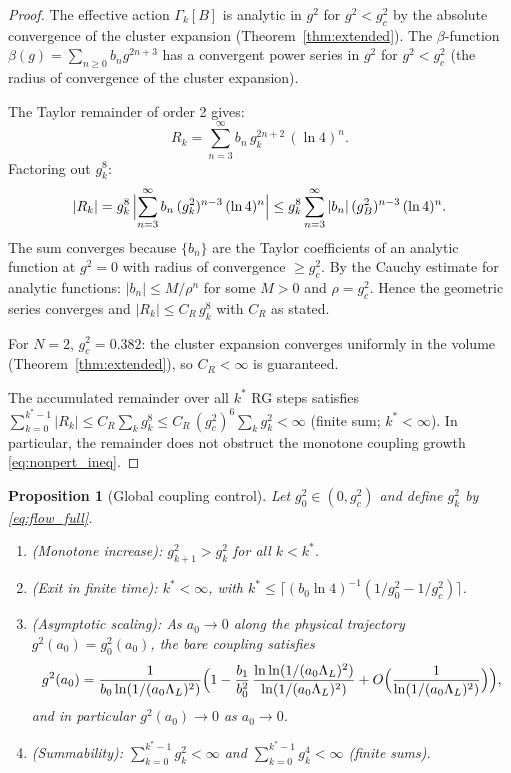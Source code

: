 \documentclass[11pt,a4paper]{amsart}
\newtheorem{proposition}[theorem]{Proposition}
\theoremstyle{definition}
\newcommand{\gB}{g^2_c}
\begin{document}
\begin{proof}
The effective action $\Gamma_k[B]$ is analytic in $g^2$ for $g^2 < \gB$
by the absolute convergence of the cluster expansion (Theorem~\ref{thm:extended}).
The $\beta$-function $\beta(g) = \sum_{n\ge 0} b_n g^{2n+3}$ has a
convergent power series in $g^2$ for $g^2 < \gB$ (the radius of convergence
of the cluster expansion).

The Taylor remainder of order 2 gives:
\[
  R_k = \sum_{n=3}^{\infty} b_n\,g^{2n+2}_k\,(\ln 4)^n.
\]
Factoring out $g^8_k$:
\[
  |R_k| = g^8_k\,\Bigl|\sum_{n=3}^{\infty} b_n\,(g^2_k)^{n-3}\,(\ln 4)^n\Bigr|
  \le g^8_k \sum_{n=3}^{\infty} |b_n|\,(g^2_B)^{n-3}\,(\ln 4)^n.
\]
The sum converges because $\{b_n\}$ are the Taylor coefficients of an analytic
function at $g^2 = 0$ with radius of convergence $\ge \gB$.  By the Cauchy
estimate for analytic functions: $|b_n| \le M / \rho^n$ for some $M > 0$
and $\rho = \gB$.  Hence the geometric series converges and
$|R_k| \le C_R\,g^8_k$ with $C_R$ as stated.

For $N = 2$, $\gB = 0.382$: the cluster expansion converges uniformly
in the volume (Theorem~\ref{thm:extended}), so $C_R < \infty$ is guaranteed.

The accumulated remainder over all $k^*$ RG steps satisfies
$\sum_{k=0}^{k^*-1}|R_k| \le C_R\sum_k g^8_k \le C_R\,(\gB)^6\sum_k g^2_k < \infty$
(finite sum; $k^*<\infty$).  In particular, the remainder does not obstruct
the monotone coupling growth \eqref{eq:nonpert_ineq}.
\end{proof}

\begin{proposition}[Global coupling control]
\label{prop:global_coupling}
Let $g^2_0 \in (0,\gB)$ and define $g^2_k$ by \eqref{eq:flow_full}.
\begin{enumerate}[label=(\roman*)]
\item \emph{(Monotone increase):} $g^2_{k+1} > g^2_k$ for all $k < k^*$.
\item \emph{(Exit in finite time):} $k^* < \infty$, with
  $k^* \le \lceil (b_0 \ln 4)^{-1}(1/g^2_0 - 1/\gB)\rceil$.
\item \emph{(Asymptotic scaling):} As $a_0 \to 0$ along the physical
  trajectory $g^2(a_0) = g^2_0(a_0)$, the bare coupling satisfies
  \begin{equation}\label{eq:asymptotic_scaling}
    g^2(a_0) = \frac{1}{b_0\ln(1/(a_0\Lambda_L)^2)}
    \Bigl(1 - \frac{b_1}{b_0^2}\,
    \frac{\ln\ln(1/(a_0\Lambda_L)^2)}{\ln(1/(a_0\Lambda_L)^2)}
    + O\Bigl(\frac{1}{\ln(1/(a_0\Lambda_L)^2)}\Bigr)\Bigr),
  \end{equation}
  and in particular $g^2(a_0) \to 0$ as $a_0\to 0$.
\item \emph{(Summability):} $\sum_{k=0}^{k^*-1} g^2_k < \infty$ and
  $\sum_{k=0}^{k^*-1} g^4_k < \infty$ (finite sums).
\end{enumerate}
\end{proposition}
\end{document}
